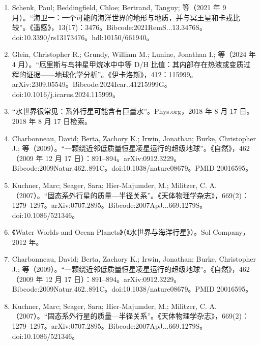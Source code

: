 \begin{enumerate}
\item Schenk, Paul; Beddingfield, Chloe; Bertrand, Tanguy; 等（2021 年 9 月）。“海卫一：一个可能的海洋世界的地形与地质，并与冥王星和卡戎比较”。《遥感》，13(17)：3476。Bibcode:2021RemS...13.3476S。doi:10.3390/rs13173476。hdl:10150/661940。
\item Glein, Christopher R.; Grundy, William M.; Lunine, Jonathan I.; 等（2024 年 4 月）。“厄里斯与鸟神星甲烷冰中中等 D/H 比值：其内部存在热液或变质过程的证据——地球化学分析”。《伊卡洛斯》，412：115999。arXiv:2309.05549。Bibcode:2024Icar..41215999G。doi:10.1016/j.icarus.2024.115999。
\item “水世界很常见：系外行星可能含有巨量水”。Phys.org，2018 年 8 月 17 日。2018 年 8 月 17 日检索。
\item Charbonneau, David; Berta, Zachory K.; Irwin, Jonathan; Burke, Christopher J.; 等（2009）。“一颗绕近邻低质量恒星凌星运行的超级地球”。《自然》，462（2009 年 12 月 17 日）：891–894。arXiv:0912.3229。Bibcode:2009Natur.462..891C。doi:10.1038/nature08679。PMID 20016595。
\item Kuchner, Marc; Seager, Sara; Hier-Majumder, M.; Militzer, C. A.（2007）。“固态系外行星的质量—半径关系”。《天体物理学杂志》，669(2)：1279–1297。arXiv:0707.2895。Bibcode:2007ApJ...669.1279S。doi:10.1086/521346。
\item 《Water Worlds and Ocean Planets》（《水世界与海洋行星》）。Sol Company，2012 年。
\item Charbonneau, David; Berta, Zachory K.; Irwin, Jonathan; Burke, Christopher J.; 等（2009）。“一颗绕近邻低质量恒星凌星运行的超级地球”。《自然》，462（2009 年 12 月 17 日）：891–894。arXiv:0912.3229。Bibcode:2009Natur.462..891C。doi:10.1038/nature08679。PMID 20016595。
\item Kuchner, Marc; Seager, Sara; Hier-Majumder, M.; Militzer, C. A.（2007）。“固态系外行星的质量—半径关系”。《天体物理学杂志》，669(2)：1279–1297。arXiv:0707.2895。Bibcode:2007ApJ...669.1279S。doi:10.1086/521346。

\end{enumerate}